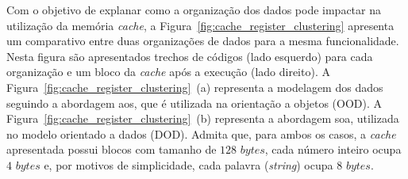 

Com o objetivo de explanar como a organização dos dados pode impactar na utilização da memória \textit{cache}, a Figura~\ref{fig:cache_register_clustering} apresenta um comparativo entre duas organizações de dados para a mesma funcionalidade. 
Nesta figura são apresentados trechos de códigos (lado esquerdo) para cada organização e um bloco da \textit{cache} após a execução (lado direito).
A Figura~\ref{fig:cache_register_clustering}~(a) representa a modelagem dos dados seguindo a abordagem \ac{aos}, que é utilizada na orientação a objetos (OOD).
A Figura~\ref{fig:cache_register_clustering}~(b) representa a abordagem \ac{soa}, utilizada no modelo orientado a dados (DOD).
Admita que, para ambos os casos, a \textit{cache} apresentada possui blocos com tamanho de $128$ $bytes$, cada número inteiro ocupa $4$ $bytes$ e, por motivos de simplicidade, cada palavra (\textit{string}) ocupa $8$ $bytes$. 


